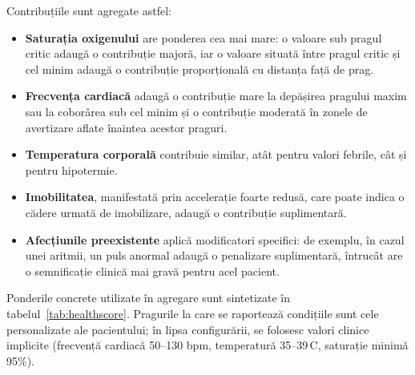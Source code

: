﻿\documentclass[12pt,a4paper,twoside]{article}
\begin{document}
Contribuțiile sunt agregate astfel:

\begin{itemize}[leftmargin=1.5em]
\item \textbf{Saturația oxigenului} are ponderea cea mai mare: o valoare sub pragul critic adaugă o contribuție majoră, iar o valoare situată între pragul critic și cel minim adaugă o contribuție proporțională cu distanța față de prag.
\item \textbf{Frecvența cardiacă} adaugă o contribuție mare la depășirea pragului maxim sau la coborârea sub cel minim și o contribuție moderată în zonele de avertizare aflate înaintea acestor praguri.
\item \textbf{Temperatura corporală} contribuie similar, atât pentru valori febrile, cât și pentru hipotermie.
\item \textbf{Imobilitatea}, manifestată prin accelerație foarte redusă, care poate indica o cădere urmată de imobilizare, adaugă o contribuție suplimentară.
\item \textbf{Afecțiunile preexistente} aplică modificatori specifici: de exemplu, în cazul unei aritmii, un puls anormal adaugă o penalizare suplimentară, întrucât are o semnificație clinică mai gravă pentru acel pacient.
\end{itemize}

Ponderile concrete utilizate în agregare sunt sintetizate în tabelul~\ref{tab:healthscore}. Pragurile la care se raportează condițiile sunt cele personalizate ale pacientului; în lipsa configurării, se folosesc valori clinice implicite (frecvență cardiacă 50--130 bpm, temperatură 35--39\,\textdegree C, saturație minimă 95\%).
\end{document}
